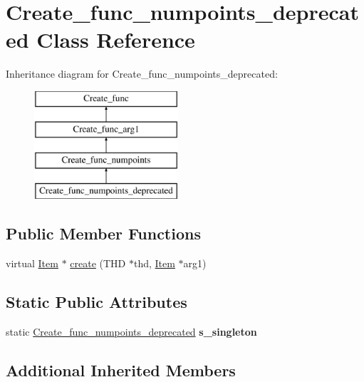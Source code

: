 \hypertarget{classCreate__func__numpoints__deprecated}{}\section{Create\+\_\+func\+\_\+numpoints\+\_\+deprecated Class Reference}
\label{classCreate__func__numpoints__deprecated}
Inheritance diagram for Create\+\_\+func\+\_\+numpoints\+\_\+deprecated\+:\begin{figure}[H]
\begin{center}
\leavevmode
\includegraphics[height=4.000000cm]{classCreate__func__numpoints__deprecated}
\end{center}
\end{figure}
\subsection*{Public Member Functions}
\begin{DoxyCompactItemize}
\item 
virtual \mbox{\hyperlink{classItem}{Item}} $\ast$ \mbox{\hyperlink{classCreate__func__numpoints__deprecated_aa1535981a4695ba9499044699b0952e3}{create}} (T\+HD $\ast$thd, \mbox{\hyperlink{classItem}{Item}} $\ast$arg1)
\end{DoxyCompactItemize}
\subsection*{Static Public Attributes}
\begin{DoxyCompactItemize}
\item 
\mbox{\label{classCreate__func__numpoints__deprecated_a45697bda63226d5716770a75122ad591}} 
static \mbox{\hyperlink{classCreate__func__numpoints__deprecated}{Create\+\_\+func\+\_\+numpoints\+\_\+deprecated}} {\bfseries s\+\_\+singleton}
\end{DoxyCompactItemize}
\subsection*{Additional Inherited Members}


